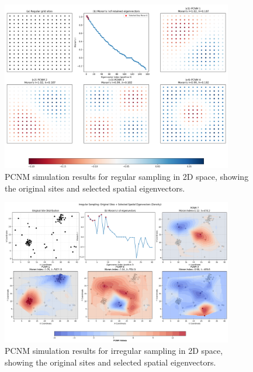 \begin{figure}
\centering
\includegraphics[width=0.9\textwidth]{../results/preliminary_results/pcnm_simulation_2d_equally_spaced.png}
\caption{PCNM simulation results for regular sampling in 2D space, showing the original sites and selected spatial eigenvectors.}
\label{fig:pcnm_simulation_2d_equally_spaced}
\end{figure}

\begin{figure}[!h]
\centering
\includegraphics[width=0.9\textwidth]{../results/preliminary_results/pcnm_simulation_2d_randomly_spaced.png}
\caption{PCNM simulation results for irregular sampling in 2D space, showing the original sites and selected spatial eigenvectors.}
\label{fig:pcnm_simulation_2d_randomly_spaced}
\end{figure}

